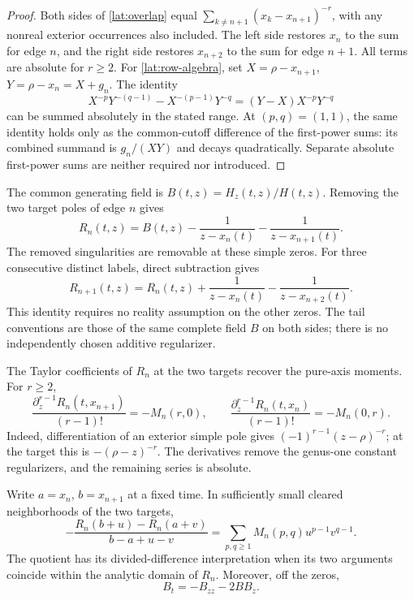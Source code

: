 \begin{proof}
Both sides of \eqref{lat:overlap} equal
$\sum_{k\ne n+1}(x_k-x_{n+1})^{-r}$, with any nonreal exterior
occurrences also included. The left side restores $x_n$ to the
sum for edge $n$, and the right side restores $x_{n+2}$ to the sum
for edge $n+1$. All terms are absolute for $r\ge2$.
For \eqref{lat:row-algebra}, set
$X=\rho-x_{n+1}$, $Y=\rho-x_n=X+g_n$. The identity
\[
 X^{-p}Y^{-(q-1)}-X^{-(p-1)}Y^{-q}
 =(Y-X)X^{-p}Y^{-q}
\]
can be summed absolutely in the stated range. At $(p,q)=(1,1)$,
the same identity holds only as the common-cutoff difference of
the first-power sums: its combined summand is $g_n/(XY)$ and
decays quadratically. Separate absolute first-power sums are neither
required nor introduced.
\end{proof}

The common generating field is $B(t,z)=H_z(t,z)/H(t,z)$.
Removing the two target poles of edge $n$ gives
\begin{equation}
 R_n(t,z)=B(t,z)-\frac1{z-x_n(t)}-\frac1{z-x_{n+1}(t)}.
 \label{lat:resolvent}
\end{equation}
The removed singularities are removable at these simple zeros.
For three consecutive distinct labels, direct subtraction gives
\begin{equation}
 R_{n+1}(t,z)=R_n(t,z)+\frac1{z-x_n(t)}
                         -\frac1{z-x_{n+2}(t)}.
 \label{lat:resolvent-shift}
\end{equation}
This identity requires no reality assumption on the other zeros.
The tail conventions are those of the same complete field $B$ on
both sides; there is no independently chosen additive regularizer.

The Taylor coefficients of $R_n$ at the two targets recover the
pure-axis moments. For $r\ge2$,
\begin{equation}
 \frac{\partial_z^{r-1}R_n(t,x_{n+1})}{(r-1)!}
       =-M_n(r,0),\qquad
 \frac{\partial_z^{r-1}R_n(t,x_n)}{(r-1)!}
       =-M_n(0,r).
 \label{lat:axis-taylor}
\end{equation}
Indeed, differentiation of an exterior simple pole gives
$(-1)^{r-1}(z-\rho)^{-r}$; at the target this is
$-(\rho-z)^{-r}$. The derivatives remove the genus-one constant
regularizers, and the remaining series is absolute.

\begin{proposition}\label{lat:generator-prop}
Write $a=x_n$, $b=x_{n+1}$ at a fixed time. In sufficiently small
cleared neighborhoods of the two targets,
\begin{equation}
 -\frac{R_n(b+u)-R_n(a+v)}{b-a+u-v}
 =\sum_{p,q\ge1}M_n(p,q)u^{p-1}v^{q-1}.
 \label{lat:generator}
\end{equation}
The quotient has its divided-difference interpretation when its
two arguments coincide within the analytic domain of $R_n$.
Moreover, off the zeros,
\begin{equation}
 B_t=-B_{zz}-2BB_z.
 \label{lat:burgers}
\end{equation}
\end{proposition}

